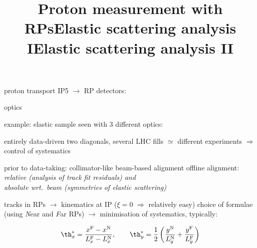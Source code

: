 \newpage %
\title{Proton measurement with RPs}
\vskip-2mm

\> proton transport IP5 $\rightarrow$ RP detectors:


\> optics



\> example: elastic sample seen with 3 different optics:



\newpage %
\title{Elastic scattering analysis I}

\> entirely data-driven
\> two diagonals, several LHC fills $\simeq$ different experiments $\Rightarrow$ control of systematics

\vfil
\noindent{}\cFg
\> prior to data-taking: collimator-like beam-based alignment
\> offline alignment: \em{relative} (analysis of track fit residuals) and\\ \em{absolute wrt.~beam} (symmetries of elastic scattering)

\vfil
\noindent{}\cFg

\> tracks in RPs $\mathop{\longrightarrow}$ kinematics at IP ($\xi = 0$ $\Rightarrow$ relatively easy)
\> choice of formulae (using {\it N}ear and {\it F}ar RPs) $\rightarrow$ minimisation of systematics, typically:

$$\th_x^* = {x^{\rm F} - x^{\rm N}\over L_x^{\rm F} - L_x^{\rm N}} ,\qquad \th_y^* = {1\over 2} \left ( {y^{\rm N}\over L_y^{\rm N}} + {y^{\rm F}\over L_y^{\rm F}} \right )$$

\newpage %
\title{Elastic scattering analysis II}

